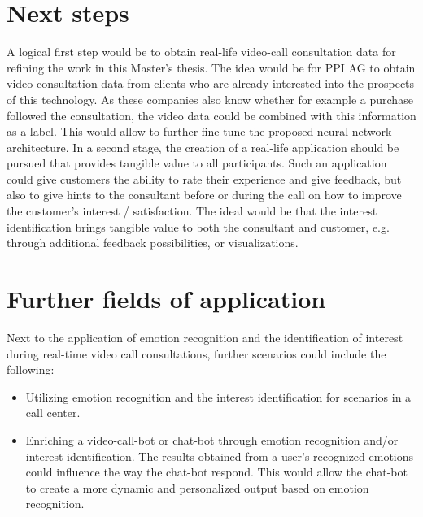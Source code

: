 \section{Next steps}
A logical first step would be to obtain real-life video-call consultation data for refining the work in this Master's thesis. The idea would be for PPI AG to obtain video consultation data from clients who are already interested into the prospects of this technology. As these companies also know whether for example a purchase followed the consultation, the video data could be combined with this information as a label. This would allow to further fine-tune the proposed neural network architecture.
\newline\newline
In a second stage, the creation of a real-life application should be pursued that provides tangible value to all participants. Such an application could give customers the ability to rate their experience and give feedback, but also to give hints to the consultant before or during the call on how to improve the customer's interest / satisfaction. The ideal would be that the interest identification brings tangible value to both the consultant and customer, e.g. through additional feedback possibilities, or visualizations.


\section{Further fields of application}
Next to the application of emotion recognition and the identification of interest during real-time video call consultations, further scenarios could include the following:\newline
\begin{itemize}
    \item Utilizing emotion recognition and the interest identification for scenarios in a call center.
    \item Enriching a video-call-bot or chat-bot through emotion recognition and/or interest identification. The results obtained from a user's recognized emotions could influence the way the chat-bot respond. This would allow the chat-bot to create a more dynamic and personalized output based on emotion recognition.
\end{itemize}


